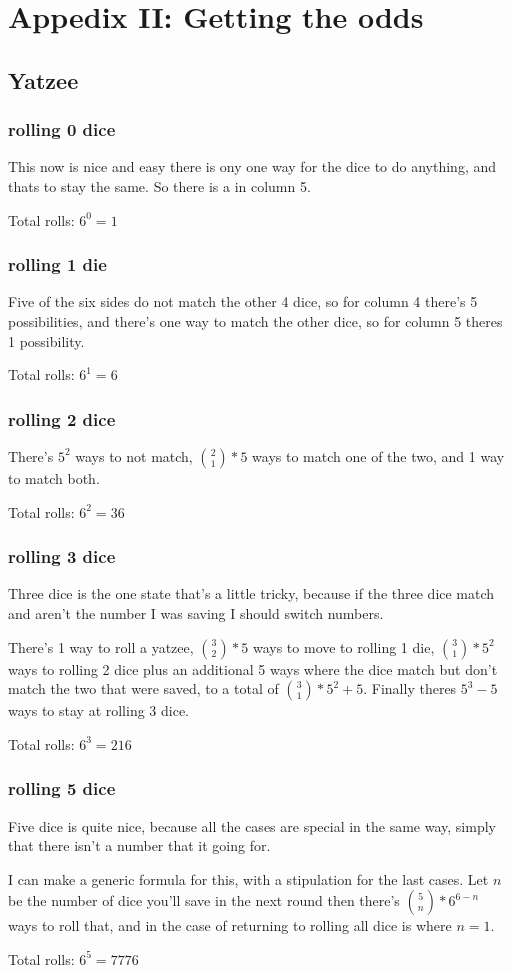 \section{Appedix II: Getting the odds}

\subsection{Yatzee}

\subsubsection{rolling 0 dice}
This now is nice and easy there is ony one way for the dice to do anything, and thats to stay the same. So there is a  in column 5.

Total rolls: $6^0=1$
\subsubsection{rolling 1 die}
Five of the six sides do not match the other 4 dice, so for column 4 there's 5 possibilities, and there's one way to match the other dice, so for column 5 theres 1 possibility.

Total rolls: $6^1=6$
\subsubsection{rolling 2 dice}
There's $5^2$ ways to not match, ${2 \choose 1}*5$ ways to match one of the two, and 1 way to match both.

Total rolls: $6^2=36$
\subsubsection{rolling 3 dice}
Three dice is the one state that's a little tricky, because if the three dice match and aren't the number I was saving I should switch numbers. 

There's 1 way to roll a yatzee, ${3 \choose 2}*5$ ways to move to rolling 1 die, ${3 \choose 1}*5^2$ ways to rolling 2 dice plus an additional 5 ways where the dice match but don't match the two that were saved, to a total of ${3 \choose 1}*5^2+5$. Finally theres $5^3-5$ ways to stay at rolling 3 dice. 

Total rolls: $6^3=216$

\subsubsection{rolling 5 dice}
Five dice is quite nice, because all the cases are special in the same way, simply that there isn't a number that it going for. 

I can make a generic formula for this, with a stipulation for the last cases. Let $n$ be the number of dice you'll save in the next round then there's ${5 \choose n}*6^{6-n}$ ways to roll that, and in the case of returning to rolling all dice is where $n = 1$. 

Total rolls: $6^5=7776$
